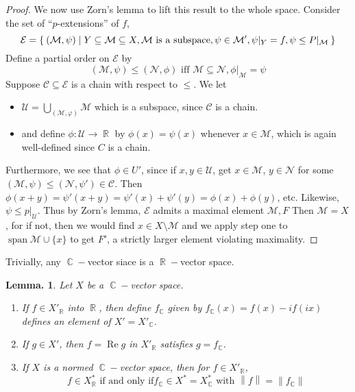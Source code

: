 \documentclass[11pt, a4paper]{memoir}
\DeclareMathOperator{\R}{{\mathbb{R}}}
\DeclareMathOperator{\C}{{\mathbb{C}}}
\newcommand{\norm}[1]{\ensuremath{\left\lVert#1\right\rVert}}
\theoremstyle{change}
\newtheorem{lemma}[theorem]{Lemma.}
\theoremstyle{plain}
\theoremstyle{nonumberplain}
\newtheorem{proof}{Proof}
\DeclareMathOperator{\spn}{span}
\renewcommand{\Re}{\ensuremath{\operatorname{Re}}}
\numberwithin{equation}{section}
\begin{document}
\begin{proof}
    We now use Zorn's lemma to lift this result to the whole space.
    Consider the set of ``$p$-extensions'' of $f$,
    \begin{equation*}
        \mathcal{E} = \Set{(\mathcal{M},\psi) | Y\subseteq\mathcal{M}\subseteq X,\mathcal{M}\text{ is a subspace}, \psi\in\mathcal{M}',\psi|_Y=f,\psi\leq P|_{\mathcal{M}}}
    \end{equation*}
    Define a partial order on $\mathcal{E}$ by
    \begin{equation*}
        (\mathcal{M},\psi)\leq(\mathcal{N},\phi)\text{ iff }\mathcal{M}\subseteq\mathcal{N},\phi|_{\mathcal{M}}=\psi
    \end{equation*}
    Suppose $\mathcal{C}\subseteq\mathcal{E}$ is a chain with respect to $\leq$.
    We let
    \begin{itemize}[nl]
        \item $\mathcal{U}=\bigcup_{(\mathcal{M},\varphi)}\mathcal{M}$ which is a subspace, since $\mathcal{C}$ is a chain.
        \item and define $\phi:\mathcal{U}\to\R$ by $\phi(x)=\psi(x)$ whenever $x\in\mathcal{M}$, which is again well-defined since $C$ is a chain.
    \end{itemize}
    Furthermore, we see that $\phi\in U'$, since if $x,y\in\mathcal{U}$, get $x\in\mathcal{M}$, $y\in\mathcal{N}$ for some $(\mathcal{M},\psi)\leq(\mathcal{N},\psi')\in\mathcal{C}$.
    Then $\phi(x+y)=\psi'(x+y)=\psi'(x)+\psi'(y)=\phi(x)+\phi(y)$, etc.
    Likewise, $\psi\leq p|_{\mathcal{U}}$.
    Thus by Zorn's lemma, $\mathcal{E}$ admits a maximal element $\mathcal{M},F$
    Then $\mathcal{M}=X$, for if not, then we would find $x\in X\setminus\mathcal{M}$ and we apply step one to $\spn\mathcal{M}\cup\{x\}$ to get $F'$, a strictly larger element violating maximality.
\end{proof}
Trivially, any $\C-$vector siace is a $\R-$vector space.
\begin{lemma}
    Let $X$ be a $\C-$vector space.
    \begin{enumerate}[nl,r]
        \item If $f\in X'_{\R}$ into $\R$, then define $f_{\C}$ given by $f_{\C}(x)=f(x)-if(ix)$ defines an element of $X'=X'_{\C}$.
        \item If $g\in X'$, then $f=\Re g$ in $X'_{\R}$ satisfies $g=f_{\C}$.
        \item If $X$ is a normed $\C-$vector space, then for $f\in X'_{\R}$,
            \begin{equation*}
                f\in X^*_{\R}\text{ if and only if}f_{\C}\in X^*=X^*_{\C}\text{ with }\norm{f}=\norm{f_{\C}}
            \end{equation*}
    \end{enumerate}
\end{lemma}
\end{document}
